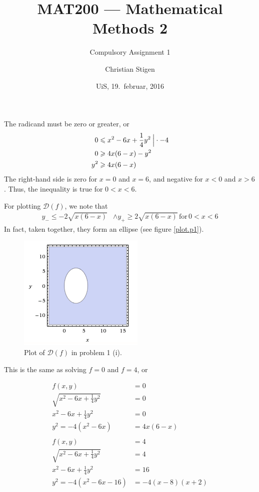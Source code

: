 \documentclass[a4paper,norsk,12pt]{article}
\title{MAT200 --- Mathematical Methods 2}
\subtitle{Compulsory Assignment 1}
\author{Christian Stigen}
\date{UiS, 19.~februar, 2016}
\begin{document}
\maketitle

\label{problem.1}

The radicand must be zero or greater, or
\begin{align*}
  0 & \leqslant x^2-6x+\frac{1}{4}y^2 \> \Big{|} \cdot-4 \\
  0 & \geqslant 4x(6-x)-y^2 \\
  y^2 & \geqslant 4x(6-x)
\end{align*}
The right-hand side is zero for $x=0$ and $x=6$, and negative for $x<0$
and $x>6$. Thus, the inequality is true for $0 < x < 6$.

For plotting $\mathcal{D}(f)$, we note that
\begin{align*}
  y_{-} \leqslant -2\sqrt{x(6-x)} & \wedge y_{+} \geqslant 2\sqrt{x(6-x)}
  \,\text{for}\, 0<x<6
\end{align*}
In fact, taken together, they form an ellipse (see figure \vref{plot.p1}).

\begin{figure}[htp]
  \centering
  \includegraphics{ob1plot.png}
  \caption{Plot of $\mathcal{D}(f)$ in problem 1 (i).}
  \label{plot.p1}
\end{figure}


This is the same as solving $f=0$ and $f=4$, or

\begin{align*}
  f(x,y) &= 0 \\
  \sqrt{x^2 - 6x + \frac{1}{4}y^2} &= 0\\
  x^2 - 6x + \frac{1}{4}y^2 &= 0\\
  y^2 = -4(x^2 - 6x) &= 4x(6-x) \\
  \\
  f(x,y) &= 4 \\
  \sqrt{x^2 - 6x + \frac{1}{4}y^2} &= 4\\
  x^2 - 6x + \frac{1}{4}y^2 &= 16 \\
  y^2 = -4\left(x^2 - 6x - 16\right) &= -4(x-8)(x+2) \\
\end{align*}
\end{document}
